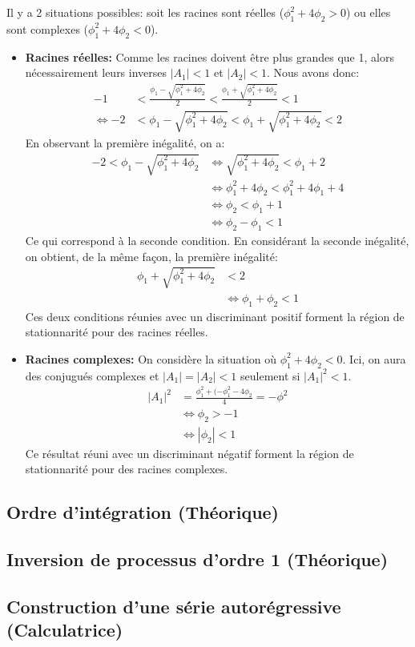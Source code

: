 \documentclass{article}
\begin{document}
Il y a 2 situations possibles: soit les racines sont réelles ($\phi_1^2+4\phi_2>0$) ou elles sont complexes ($\phi_1^2+4\phi_2<0$).
\begin{itemize}
\item \textbf{Racines réelles:}
  Comme les racines doivent être plus grandes que 1, alors nécessairement leurs inverses $|A_1|<1$ et $|A_2|<1$. Nous avons donc:
  \begin{align*}
    -1 &< \frac{\phi_1-\sqrt{\phi_1^2+4\phi_2}}{2} <  \frac{\phi_1+\sqrt{\phi_1^2+4\phi_2}}{2} < 1 \\
    \Leftrightarrow -2 &< \phi_1-\sqrt{\phi_1^2+4\phi_2} < \phi_1+\sqrt{\phi_1^2+4\phi_2} < 2
  \end{align*}
  En observant la première inégalité, on a:
  \begin{align*}
    -2 < \phi_1-\sqrt{\phi_1^2+4\phi_2}
    &\Leftrightarrow \sqrt{\phi_1^2+4\phi_2}<\phi_1+2 \\
    &\Leftrightarrow \phi_1^2+4\phi_2 < \phi_1^2+4\phi_1+4 \\
    &\Leftrightarrow \phi_2 < \phi_1 + 1 \\
    &\Leftrightarrow \phi_2 - \phi_1 < 1
  \end{align*}
  Ce qui correspond à la seconde condition. En considérant la seconde inégalité, on obtient, de la même façon, la première inégalité:
  \begin{align*}
    \phi_1+\sqrt{\phi_1^2+4\phi_2} &< 2 \\
    &\Leftrightarrow \phi_1 + \phi_2 < 1
  \end{align*}
  Ces deux conditions réunies avec un discriminant positif forment la région de stationnarité pour des racines réelles.
  
\item \textbf{Racines complexes:}  
  On considère la situation où $\phi_1^2+4\phi_2<0$. Ici, on aura des conjugués complexes et $|A_1| = |A_2| <1$ seulement si $|A_1|^2<1$.
  \begin{align*}
    |A_1|^2 &=\frac{\phi_1^2+(-\phi_1^2-4\phi_2}{4}=-\phi^2 \\
    &\Leftrightarrow \phi_2>-1 \\
    &\Leftrightarrow |\phi_2|<1
  \end{align*}
  Ce résultat réuni avec un discriminant négatif forment la région de stationnarité pour des racines complexes.
\end{itemize}

\clearpage
\subsection{Ordre d'intégration (Théorique)}




\clearpage
\subsection{Inversion de processus d'ordre 1 (Théorique)}


\clearpage
\subsection{Construction d'une série autorégressive (Calculatrice)}


\clearpage


\end{document}
